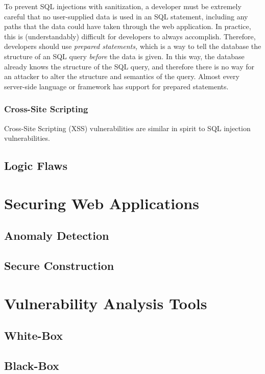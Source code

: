 To prevent SQL injections with sanitization, a developer must be
extremely careful that no user-supplied data is used in an SQL
statement, including any paths that the data could have taken through
the web application. In practice, this is (understandably) difficult
for developers to always accomplish. Therefore, developers should use
\emph{prepared statements,} which is a way to tell the database the
structure of an SQL query \emph{before} the data is given. In this
way, the database already knows the structure of the SQL query, and
therefore there is no way for an attacker to alter the structure and
semantics of the query. Almost every server-side language or framework
has support for prepared statements.

\subsubsection{Cross-Site Scripting}

Cross-Site Scripting (XSS) vulnerabilities are similar in spirit to
SQL injection vulnerabilities.

\subsection{Logic Flaws}

\section{Securing Web Applications}

\subsection{Anomaly Detection}

\subsection{Secure Construction}

\section{Vulnerability Analysis Tools}

\subsection{White-Box}

\subsection{Black-Box}

